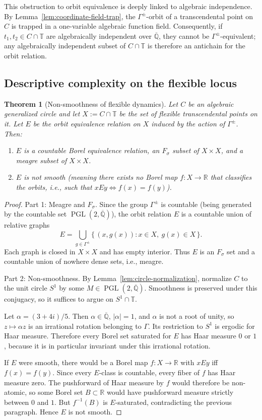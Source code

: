 \documentclass[11pt,a4paper]{article}
\theoremstyle{plain}
\newtheorem{theorem}{Theorem}[section]
\theoremstyle{definition}
\newcommand{\R}{\mathbb{R}}
\newcommand{\Alg}{\overline{\mathbb{Q}}}
\newcommand{\trans}{\mathbb{T}}
\newcommand{\Tc}{\trans}
\DeclareMathOperator{\PGL}{PGL}
\begin{document}
This obstruction to orbit equivalence is deeply linked to algebraic independence. By Lemma~\ref{lem:coordinate-field-trap}, the $\Gamma^{\pm}$-orbit of a transcendental point on $C$ is trapped in a one-variable algebraic function field. Consequently, if $t_1,t_2\in C\cap\Tc$ are algebraically independent over $\Alg$, they cannot be $\Gamma^{\pm}$-equivalent; any algebraically independent subset of $C\cap\Tc$ is therefore an antichain for the orbit relation.

\subsection{Descriptive complexity on the flexible locus}

\begin{theorem}[Non-smoothness of flexible dynamics]\label{thm:orbit-complexity-circle}
	Let $C$ be an algebraic generalized circle and let $X:=C\cap\Tc$ be the set of flexible transcendental points on it. Let $E$ be the orbit equivalence relation on $X$ induced by the action of $\Gamma^{\pm}$. Then:
	\begin{enumerate}[leftmargin=2em,itemsep=0.25ex]
		\item $E$ is a countable Borel equivalence relation, an $F_\sigma$ subset of $X\times X$, and a meagre subset of $X\times X$.
		\item $E$ is not smooth (meaning there exists no Borel map $f:X\to\R$ that classifies the orbits, i.e., such that $xEy \iff f(x)=f(y)$).
	\end{enumerate}
\end{theorem}
\begin{proof}
	Part 1: Meagre and $F_\sigma$.
	Since the group $\Gamma^{\pm}$ is countable (being generated by the countable set $\PGL(2,\Alg)$), the orbit relation $E$ is a countable union of relative graphs
	\[
		E = \bigcup_{g\in\Gamma^{\pm}} \{\,(x,g(x)) : x\in X,\ g(x)\in X\,\}.
	\]
	Each graph is closed in $X\times X$ and has empty interior. Thus $E$ is an $F_\sigma$ set and a countable union of nowhere dense sets, i.e., meagre.

	Part 2: Non-smoothness.
	By Lemma~\ref{lem:circle-normalization}, normalize $C$ to the unit circle $S^1$ by some $M\in\PGL(2,\Alg)$. Smoothness is preserved under this conjugacy, so it suffices to argue on $S^1\cap\Tc$.
	
	Let $\alpha=(3+4i)/5$. Then $\alpha\in\Alg$, $|\alpha|=1$, and $\alpha$ is not a root of unity, so $z\mapsto \alpha z$ is an irrational rotation belonging to $\Gamma$. Its restriction to $S^1$ is ergodic for Haar measure. Therefore every Borel set saturated for $E$ has Haar measure $0$ or $1$, because it is in particular invariant under this irrational rotation.
	
	If $E$ were smooth, there would be a Borel map $f:X\to\R$ with $xEy$ iff $f(x)=f(y)$. Since every $E$-class is countable, every fiber of $f$ has Haar measure zero. The pushforward of Haar measure by $f$ would therefore be non-atomic, so some Borel set $B\subset\R$ would have pushforward measure strictly between $0$ and $1$. But $f^{-1}(B)$ is $E$-saturated, contradicting the previous paragraph. Hence $E$ is not smooth.
\end{proof}
\end{document}
